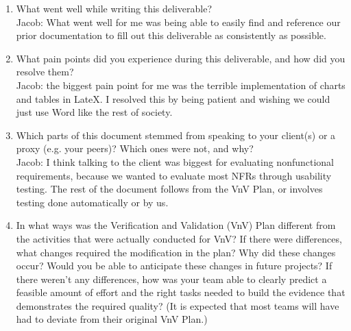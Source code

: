 \documentclass[12pt, titlepage]{article}
\begin{document}
\begin{enumerate}
  \item What went well while writing this deliverable? 
  \\Jacob: What went well for me was being able to easily find and reference our prior documentation to fill out this deliverable as consistently as possible.
  \item What pain points did you experience during this deliverable, and how
    did you resolve them?
  \\Jacob: the biggest pain point for me was the terrible implementation of charts and tables in LateX. I resolved this by being patient and wishing we could just use Word like the rest of society.
  \item Which parts of this document stemmed from speaking to your client(s) or
  a proxy (e.g. your peers)? Which ones were not, and why?
  \\Jacob: I think talking to the client was biggest for evaluating nonfunctional requirements, because we wanted to evaluate most NFRs through usability testing. The rest of the document follows from the VnV Plan, or involves testing done automatically or by us.
  \item In what ways was the Verification and Validation (VnV) Plan different
  from the activities that were actually conducted for VnV?  If there were
  differences, what changes required the modification in the plan?  Why did
  these changes occur?  Would you be able to anticipate these changes in future
  projects?  If there weren't any differences, how was your team able to clearly
  predict a feasible amount of effort and the right tasks needed to build the
  evidence that demonstrates the required quality?  (It is expected that most
  teams will have had to deviate from their original VnV Plan.)
\end{enumerate}
\end{document}
